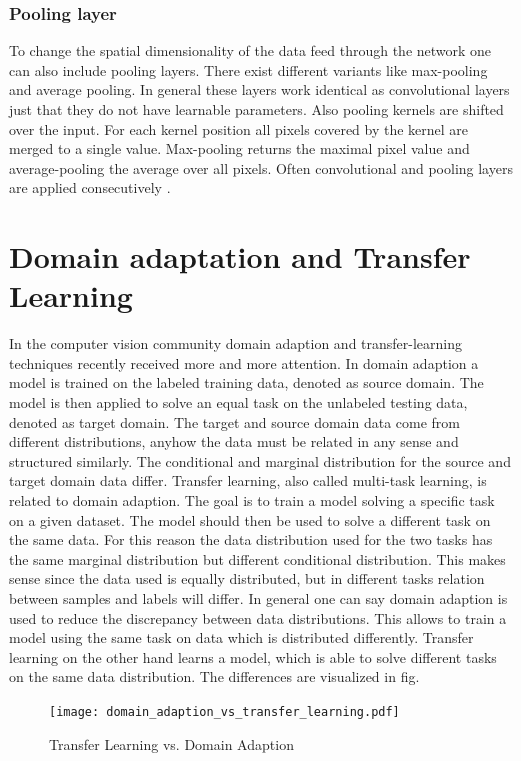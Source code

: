 \subsubsection{Pooling layer}
To change the spatial dimensionality of the data feed through the network one can also include pooling layers. There exist different variants like max-pooling and average pooling. In general these layers work identical as convolutional layers just that they do not have learnable parameters. Also pooling kernels are shifted over the input. For each kernel position all pixels covered by the kernel are merged to a single value. Max-pooling returns the maximal pixel value and average-pooling the average over all pixels. Often convolutional and pooling layers are applied consecutively \cite{OShea2015}.


\section{Domain adaptation and Transfer Learning}

In the computer vision community domain adaption and transfer-learning techniques recently received more and more attention. In domain adaption a model is trained on the labeled training data, denoted as source domain. The model is then applied to solve an equal task on the unlabeled testing data, denoted as target domain. The target and source domain data come from different distributions, anyhow the data must be related in any sense and structured similarly. The conditional and marginal distribution for the source and target domain data differ. Transfer learning, also called multi-task learning, is related to domain adaption. The goal is to train a model solving a specific task on a given dataset. The model should then be used to solve a different task on the same data. For this reason the data distribution used for the two tasks has the same marginal distribution but different conditional distribution. This makes sense since the data used is equally distributed, but in different tasks relation between samples and labels will differ. In general one can say domain adaption is used to reduce the discrepancy between data distributions. This allows to train a model using the same task on data which is distributed differently. Transfer learning on the other hand learns a model, which is able to solve different tasks on the same data distribution. The differences are visualized in fig. \label{fig:domain_adaption_vs_transfer_learning}

\begin{figure}[htpb]
  \centering
  \texttt{[image: domain\_adaption\_vs\_transfer\_learning.pdf]}
  \caption {Transfer Learning vs. Domain Adaption} \label{fig:domain_adaption_vs_transfer_learning}
\end{figure}
\FloatBarrier 

